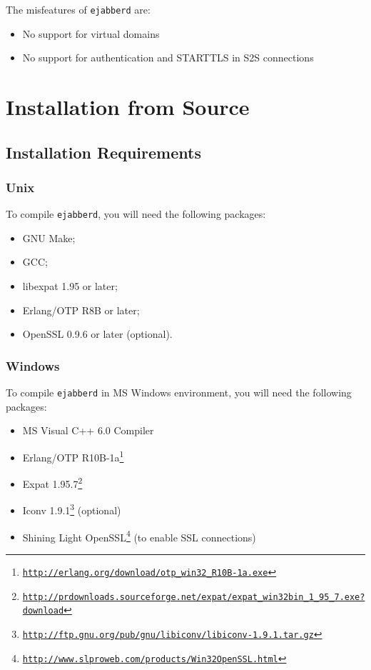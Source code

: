 \documentclass[a4paper,10pt]{article}
\newcommand{\ejabberd}{\texttt{ejabberd}}
\gdef\footahref#1#2{#2\footnote{\href{#1}{\texttt{#1}}}}
\begin{document}
The misfeatures of \ejabberd{} are:
\begin{itemize}
\item No support for virtual domains
\item No support for authentication and STARTTLS in S2S connections
\end{itemize}


\section{Installation from Source}
\label{sec:installation}

\subsection{Installation Requirements}
\label{sec:installreq}

\subsubsection{Unix}
\label{sec:installrequnix}

To compile \ejabberd{}, you will need the following packages:
\begin{itemize}
\item GNU Make;
\item GCC;
\item libexpat 1.95 or later;
\item Erlang/OTP R8B or later;
\item OpenSSL 0.9.6 or later (optional).
\end{itemize}

\subsubsection{Windows}
\label{sec:installreqwin}

To compile \ejabberd{} in MS Windows environment, you will need the following
packages:
\begin{itemize}
\item MS Visual C++ 6.0 Compiler
\item \footahref{http://erlang.org/download/otp_win32_R10B-1a.exe}{Erlang/OTP R10B-1a}
\item \footahref{http://prdownloads.sourceforge.net/expat/expat\_win32bin\_1\_95\_7.exe?download}{Expat 1.95.7}
\item
\footahref{http://ftp.gnu.org/pub/gnu/libiconv/libiconv-1.9.1.tar.gz}{Iconv 1.9.1}
(optional)
\item \footahref{http://www.slproweb.com/products/Win32OpenSSL.html}{Shining Light OpenSSL}
(to enable SSL connections)
\end{itemize}
\end{document}
